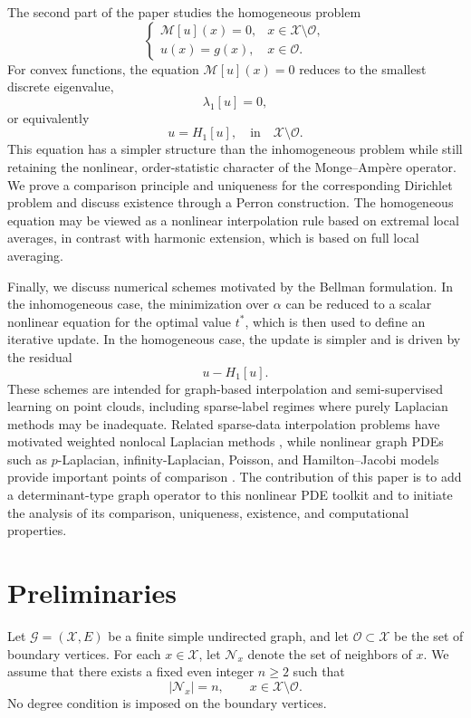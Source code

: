 \documentclass[reqno,11pt]{amsart}
\numberwithin{equation}{section}
\theoremstyle{definition}
\theoremstyle{remark}
\begin{document}
The second part of the paper studies the homogeneous problem
\[
\begin{cases}
    \mathcal M [u](x)=0, & x\in \mathcal X\setminus \mathcal O,\\
    u(x)=g(x), & x\in \mathcal O.
\end{cases}
\]
For convex functions, the equation
$\mathcal M [u](x)=0$ reduces to the smallest discrete eigenvalue,
\[
    \lambda_1[u]=0,
\]
or equivalently
\[
    u = H_1[u], \quad \text{in} \quad \mathcal X\setminus\mathcal O .
\]
This equation has a simpler structure than the inhomogeneous problem while still retaining the nonlinear, order-statistic character of the Monge--Amp\`ere operator. We prove a comparison principle and uniqueness for the corresponding Dirichlet problem and discuss existence through a Perron construction. The homogeneous equation may be viewed as a nonlinear interpolation rule based on extremal local averages, in contrast with harmonic extension, which is based on full local averaging.

Finally, we discuss numerical schemes motivated by the Bellman formulation. In the inhomogeneous case, the minimization over $\alpha$ can be reduced to a scalar nonlinear equation for the optimal value $t^*$, which is then used to define an iterative update. In the homogeneous case, the update is simpler and is driven by the residual
\[
    u-H_1[u].
\]
These schemes are intended for graph-based interpolation and semi-supervi\-sed learning on point clouds, including sparse-label regimes where purely Laplacian methods may be inadequate. Related sparse-data interpolation problems have motivated weighted nonlocal Laplacian methods \cite{ShiOsherZhu2017}, while nonlinear graph PDEs such as $p$-Laplacian, infinity-Laplacian, Poisson, and Hamilton--Jacobi models provide important points of comparison \cite{CalderCookThorpeSlepcev2020, SlepcevThorpe2019, Calder2019Game, Calder2019Lipschitz, CalderEttehad2022}. The contribution of this paper is to add a determinant-type graph operator to this nonlinear PDE toolkit and to initiate the analysis of its comparison, uniqueness, existence, and computational properties.

\section{Preliminaries}\label{sct:prelim}
Let \(\mathcal G=(\mathcal X,E)\) be a finite simple undirected graph,
and let \(\mathcal O\subset\mathcal X\) be the set of boundary
vertices. For each \(x\in\mathcal X\), let \(\mathcal N_x\) denote
the set of neighbors of \(x\). We assume that there exists a fixed
even integer \(n\ge2\) such that
\[
    |\mathcal N_x|=n,
    \qquad x\in\mathcal X\setminus\mathcal O.
\]
No degree condition is imposed on the boundary vertices.
\end{document}
